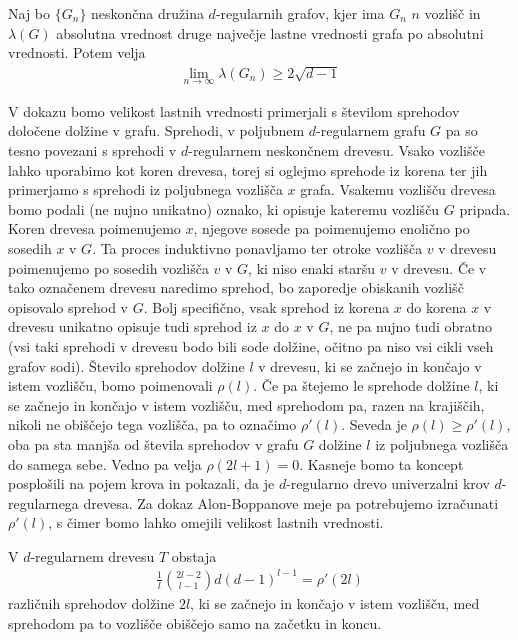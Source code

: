 \begin{izrek}
    Naj bo \(\{G_n\}\) neskončna družina \(d\)-regularnih grafov, kjer ima \(G_n\) \(n\) vozlišč in \(\lambda(G)\) absolutna vrednost druge največje lastne vrednosti grafa po absolutni vrednosti. Potem velja
    \begin{align*}
        \lim_{n\to\infty} \lambda(G_n) \geq 2\sqrt{d-1}
    \end{align*}
\end{izrek}
V dokazu bomo velikost lastnih vrednosti primerjali s številom sprehodov določene dolžine v grafu. Sprehodi, v poljubnem \(d\)-regularnem grafu \(G\) pa so tesno povezani s sprehodi v \(d\)-regularnem neskončnem drevesu. Vsako vozlišče lahko uporabimo kot koren drevesa, torej si oglejmo sprehode iz korena ter jih primerjamo s sprehodi iz poljubnega vozlišča \(x\) grafa. Vsakemu vozlišču drevesa bomo podali (ne nujno unikatno) oznako, ki opisuje kateremu vozlišču \(G\) pripada. Koren drevesa poimenujemo \(x\), njegove sosede pa poimenujemo enolično po sosedih \(x\) v \(G\). Ta proces induktivno ponavljamo ter otroke vozlišča \(v\) v drevesu poimenujemo po sosedih vozlišča \(v\) v \(G\), ki niso enaki staršu \(v\) v drevesu. Če v tako označenem drevesu naredimo sprehod, bo zaporedje obiskanih vozlišč opisovalo sprehod v \(G\). Bolj specifično, vsak sprehod iz korena \(x\) do korena \(x\) v drevesu unikatno opisuje tudi sprehod iz \(x\) do \(x\) v \(G\), ne pa nujno tudi obratno (vsi taki sprehodi v drevesu bodo bili sode dolžine, očitno pa niso vsi cikli vseh grafov sodi). Število sprehodov dolžine \(l\) v drevesu, ki se začnejo in končajo v istem vozlišču, bomo poimenovali \(\rho(l)\). Če pa štejemo le sprehode dolžine \(l\), ki se začnejo in končajo v istem vozlišču, med sprehodom pa, razen na krajiščih, nikoli ne obiščejo tega vozlišča, pa to označimo \(\rho'(l)\). Seveda je \(\rho(l)\geq \rho'(l)\), oba pa sta manjša od števila sprehodov v grafu \(G\) dolžine \(l\) iz poljubnega vozlišča do samega sebe. Vedno pa velja \(\rho(2l+1)=0\). Kasneje bomo ta koncept posplošili na pojem krova in pokazali, da je \(d\)-regularno drevo univerzalni krov \(d\)-regularnega drevesa. Za dokaz Alon-Boppanove meje pa potrebujemo izračunati \(\rho'(l)\), s čimer bomo lahko omejili velikost lastnih vrednosti\cite{polatajko}.
\begin{lema}\label{alon:drevesa-meja}
    V \(d\)-regularnem drevesu \(T\) obstaja
    \begin{align*}
        \frac{1}{l}\binom{2l-2}{l-1}d(d-1)^{l-1} = \rho'(2l)
    \end{align*}
    različnih sprehodov dolžine \(2l\), ki se začnejo in končajo v istem vozlišču, med sprehodom pa to vozlišče obiščejo samo na začetku in koncu.
\end{lema}
